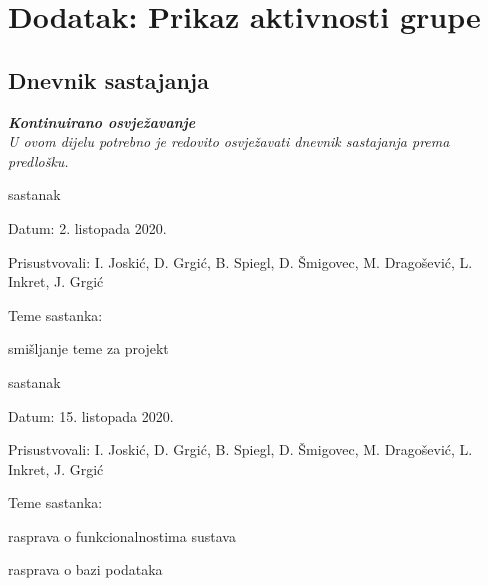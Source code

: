 \chapter*{Dodatak: Prikaz aktivnosti grupe}

\section*{Dnevnik sastajanja}

\textbf{\textit{Kontinuirano osvježavanje}}\\

\textit{U ovom dijelu potrebno je redovito osvježavati dnevnik sastajanja prema predlošku.}

\begin{packed_enum}
	\item  sastanak
	
	\item[] \begin{packed_item}
		\item Datum: 2. listopada 2020.
		\item Prisustvovali: I. Joskić, D. Grgić, B. Spiegl, D. Šmigovec, M. Dragošević, L. Inkret, J. Grgić
		\item Teme sastanka:
		\begin{packed_item}
			\item  smišljanje teme za projekt
		\end{packed_item}
	\end{packed_item}
	
	\item  sastanak
	\item[] \begin{packed_item}
		\item Datum: 15. listopada 2020.
		\item Prisustvovali: I. Joskić, D. Grgić, B. Spiegl, D. Šmigovec, M. Dragošević, L. Inkret, J. Grgić
		\item Teme sastanka:
		\begin{packed_item}
			\item  rasprava o funkcionalnostima sustava
			\item  rasprava o bazi podataka
		\end{packed_item}
	\end{packed_item}


\end{packed_enum}

